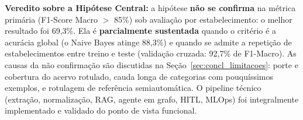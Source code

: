 \textbf{Veredito sobre a Hipótese Central:} a hipótese \textbf{não se confirma} na
métrica primária (F1-Score Macro $>$ 85\%) sob avaliação por estabelecimento: o melhor
resultado foi 69,3\%. Ela é \textbf{parcialmente sustentada} quando
o critério é a acurácia global (o Naive Bayes atinge 88,3\%) e quando
se admite a repetição de estabelecimentos entre treino e teste (validação cruzada:
92,7\% de F1-Macro). As causas da não confirmação são discutidas na
Seção~\ref{sec:concl_limitacoes}: porte e cobertura do acervo rotulado, cauda longa de
categorias com pouquíssimos exemplos, e rotulagem de referência semiautomática. O pipeline
técnico (extração, normalização, RAG, agente em grafo, HITL, MLOps) foi integralmente
implementado e validado do ponto de vista funcional.
